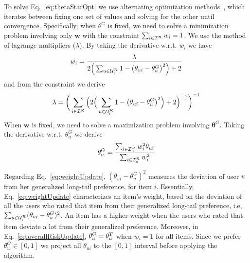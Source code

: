 To solve  Eq.~\ref{eq:thetaStarOpt} we use alternating optimization methods~\cite{koren2009matrix}, which iterates between fixing  one set of values and solving for the other until convergence. Specifically, when $\theta^G$ is fixed, we need to solve a minimization problem involving only $\mathbf{w}$   with the constraint $\sum_{i \in \mathcal{I}^{\mathcal{R}} } w_i=1$. We use the method of lagrange multipliers ($\lambda$). By taking the derivative w.r.t. $w_i$ we have  
\begin{align}
w_i = \frac{\lambda}{ 2 \Big( \sum_{u \in \mathcal{U}_{i}^{\mathcal{R}}} 1 - \big(\theta_{ui} -\theta_u^G\big)^2 \Big)  + 2 }
\label{eq:weightUpdate}
\end{align}
and from the constraint   we derive 
\begin{align}
\lambda = \bigg( \sum_{i \in \mathcal{I}^{\mathcal{R}} } \Big(  2 \Big( \sum_{u \in \mathcal{U}_{i}^{\mathcal{R}}} 1 - \big( \theta_{ui} -\theta_u^G \big)^2 \Big) + 2 \Big)^{-1}\bigg)^{-1}
\end{align}
When $\mathbf{w}$ is fixed, we need to solve a maximization problem involving $\bm{\theta}^G$. Taking the derivative w.r.t. $\theta_u^G$ we derive
\begin{align}
\theta_u^G =\frac{\sum_{i \in \mathcal{I}_{u}^{\mathcal{R}}} w_i^2 \theta_{ui}}{\sum_{i \in \mathcal{I}_{u}^{\mathcal{R}}} w_i^2} 
\label{eq:overallRiskUpdate}
\end{align}

Regarding Eq.~\ref{eq:weightUpdate}, $( \theta_{ui} -\theta_u^G)^2$  measures the deviation  of user $u$ from her generalized long-tail preference, for item $i$.  Essentially, Eq.~\ref{eq:weightUpdate} characterizes an item's weight,  based on the deviation of all the users who rated that item from their generalized long-tail preference,  i.e,~$\sum_{u \in \mathcal{U}_{i}^{\mathcal{R}}} ( \theta_{ui} -\theta_u^G)^2$.  An item  has a higher weight when the users who rated  that item deviate a lot from their generalized preference.  Moreover, in Eq.~\ref{eq:overallRiskUpdate}, $\theta_u^G=\theta_u^{T}$ when $w_i =1$ for all items.  Since we prefer $\theta_u^G \in [0,1]$ we project all $\theta_{ui}$ to the $  [0,1]$ interval before applying the algorithm.


\fi

